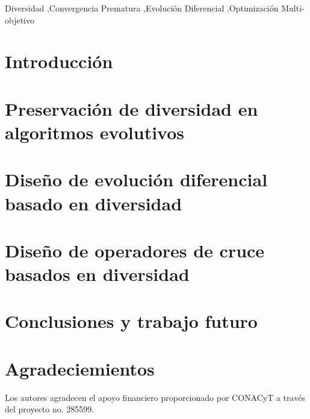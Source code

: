 \documentclass[3p]{elsarticle}
\begin{document}
\begin{frontmatter}
\begin{keyword}
Diversidad \sep Convergencia Prematura \sep Evolución Diferencial \sep Optimización Multi-objetivo 
\end{keyword}

\end{frontmatter}


\section{Introducción}
\label{sec:Introduction}


\section{Preservación de diversidad en algoritmos evolutivos}
\label{sec:Mecanismos}


\section{Diseño de evolución diferencial basado en diversidad}
\label{sec:ED}


\section{Diseño de operadores de cruce basados en diversidad}
\label{sec:Operadores}


\section{Conclusiones y trabajo futuro}
\label{sec:Conclusion}


\section{Agradeciemientos}
Los autores agradecen el apoyo financiero proporcionado por CONACyT a través del proyecto no. 285599.



\end{document}
